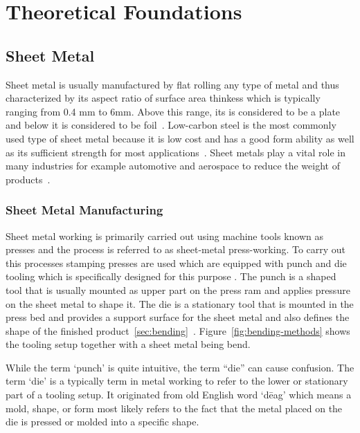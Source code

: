 \chapter{Theoretical Foundations}\label{ch:theoretical-foundations}


\section{Sheet Metal}\label{sec:sheet-metal}
Sheet metal is usually manufactured by flat rolling any type of metal and thus characterized by
its aspect ratio of surface area thinkess which is typically ranging from 0.4 mm to 6mm.
Above this range, its is considered to be a plate and below it is considered to be
foil~\cite[p. 405]{groover_fundamentalsmodernmanufacturing_2020}.
Low-carbon steel is the most commonly used type of sheet metal because it is low cost and has a good form ability as
well as its sufficient strength for most applications~\cite[p. 405]{groover_fundamentalsmodernmanufacturing_2020}.
Sheet metals play a vital role in many industries for example automotive and aerospace to reduce the weight of
products~\cite[pp. 1]{zheng_reviewformingtechniques_2018}.

\subsection{Sheet Metal Manufacturing}\label{subsec:sheet-metal-manufacturing}
Sheet metal working is primarily carried out using machine tools known as presses and the process
is referred to as sheet-metal press-working.
To carry out this processes stamping presses are used which are equipped with punch and die
tooling which is specifically designed for this purpose
\cite[p. 405]{groover_fundamentalsmodernmanufacturing_2020}.
The punch is a shaped tool that is usually mounted as upper part on the press ram and applies
pressure on the sheet metal to shape it.
The die is a stationary tool that is mounted in the press bed and provides a support surface for
the sheet metal and also defines the shape of the finished
product~\ref{sec:bending}~\cite[p. 412]{groover_fundamentalsmodernmanufacturing_2020}.
Figure~\ref{fig:bending-methods} shows the tooling setup together with a sheet metal being bend.

While the term `punch' is quite intuitive, the term ``die'' can cause confusion.
The term `die' is a typically term in metal working to refer to the lower or stationary part of a tooling setup.
It originated from old English word `dēag' which means a mold, shape, or form most likely refers to the fact that
the metal placed on the die is pressed or molded into a specific shape.


